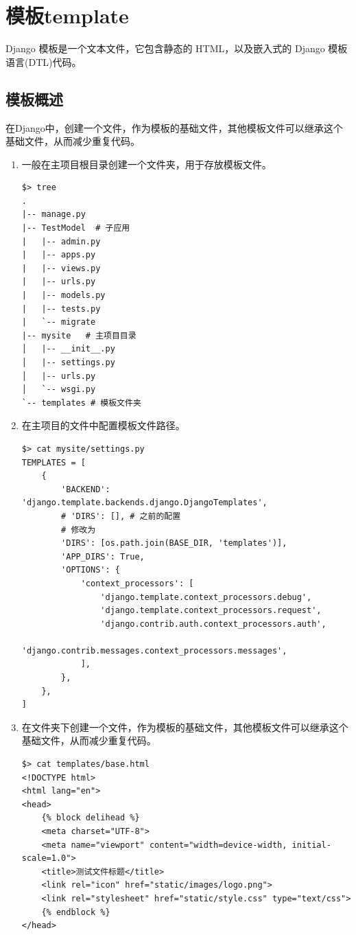 \chapter{模板template}
Django 模板是一个文本文件，它包含静态的 HTML，以及嵌入式的 Django 模板语言(DTL)代码。

\section{模板概述}
在Django中，创建一个文件，作为模板的基础文件，其他模板文件可以继承这个基础文件，从而减少重复代码。

\begin{enumerate}[label=\arabic*)]
  \item 一般在\textcolor{YBXPurple}{主项目根目录}创建一个文件夹，用于存放模板文件。
\begin{lstlisting}[style=demostyle,numbers=none]
$> tree 
.
|-- manage.py
|-- TestModel  # 子应用
|   |-- admin.py
|   |-- apps.py
|   |-- views.py
|   |-- urls.py
|   |-- models.py
|   |-- tests.py
|   `-- migrate
|-- mysite   # 主项目目录
│   |-- __init__.py
│   |-- settings.py
│   |-- urls.py
│   `-- wsgi.py
`-- templates # 模板文件夹
\end{lstlisting}

  \item 在\textcolor{YBXPurple}{主项目}的文件中配置模板文件路径。
    
\begin{lstlisting}[style=demostyle,numbers=none]
$> cat mysite/settings.py    
TEMPLATES = [
    {
        'BACKEND': 'django.template.backends.django.DjangoTemplates',
        # 'DIRS': [], # 之前的配置
        # 修改为
        'DIRS': [os.path.join(BASE_DIR, 'templates')],       
        'APP_DIRS': True,
        'OPTIONS': {
            'context_processors': [
                'django.template.context_processors.debug',
                'django.template.context_processors.request',
                'django.contrib.auth.context_processors.auth',
                'django.contrib.messages.context_processors.messages',
            ],
        },
    },
]
\end{lstlisting}

  \item 在文件夹下创建一个文件，作为模板的基础文件，其他模板文件可以继承这个基础文件，从而减少重复代码。
\begin{lstlisting}[style=demostyle, numbers=none]
$> cat templates/base.html
<!DOCTYPE html>
<html lang="en">
<head>
    {% block delihead %}
    <meta charset="UTF-8">
    <meta name="viewport" content="width=device-width, initial-scale=1.0">
    <title>测试文件标题</title>
    <link rel="icon" href="static/images/logo.png">
    <link rel="stylesheet" href="static/style.css" type="text/css">
    {% endblock %}
</head>


\end{lstlisting}
\end{enumerate}
